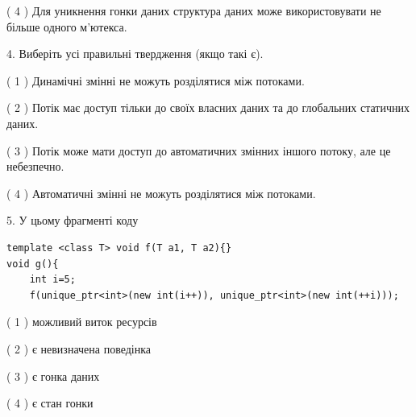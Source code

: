 \documentclass[12pt, ukrainian]{article}
\begin{document}
\begin {large}
{( 4 ) Для уникнення гонки даних структура даних може використовувати не більше одного м’ютекса.%


4. Виберіть усі правильні твердження (якщо такі є).\par
\vspace{2mm}

( 1 ) Динамічні змінні не можуть розділятися між потоками.%

( 2 ) Потік має доступ тільки до своїх власних даних та до глобальних статичних даних.%

( 3 ) Потік може мати доступ до автоматичних змінних іншого потоку, але це небезпечно.%

( 4 ) Автоматичні змінні не можуть розділятися між потоками.%


5. У цьому фрагменті коду
\begin{verbatim}
template <class T> void f(T a1, T a2){}
void g(){
    int i=5;
    f(unique_ptr<int>(new int(i++)), unique_ptr<int>(new int(++i)));
\end{verbatim}

( 1 ) можливий виток ресурсів%

( 2 ) є невизначена поведінка%

( 3 ) є гонка даних%

( 4 ) є стан гонки%
}
\end {large}
\end{document}
